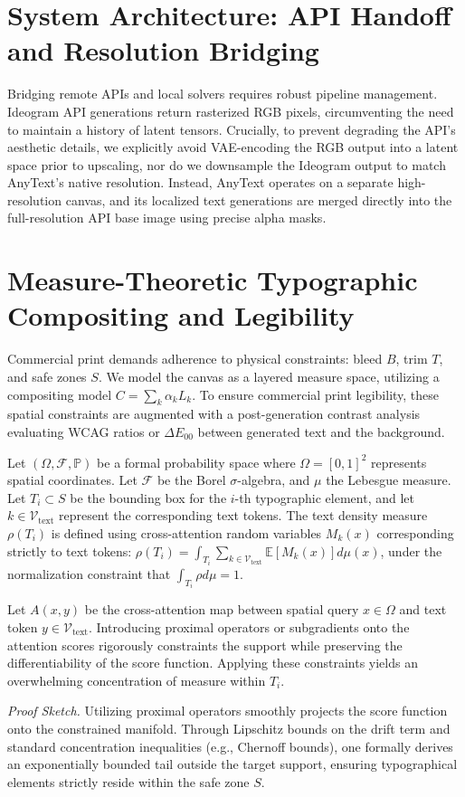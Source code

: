 \documentclass[10pt,journal,compsoc]{IEEEtran}
\begin{document}
\section{System Architecture: API Handoff and Resolution Bridging}
Bridging remote APIs and local solvers requires robust pipeline management. Ideogram API generations return rasterized RGB pixels, circumventing the need to maintain a history of latent tensors. Crucially, to prevent degrading the API's aesthetic details, we explicitly avoid VAE-encoding the RGB output into a latent space prior to upscaling, nor do we downsample the Ideogram output to match AnyText's native resolution. Instead, AnyText operates on a separate high-resolution canvas, and its localized text generations are merged directly into the full-resolution API base image using precise alpha masks.

\section{Measure-Theoretic Typographic Compositing and Legibility}
Commercial print demands adherence to physical constraints: bleed $B$, trim $T$, and safe zones $S$. We model the canvas as a layered measure space, utilizing a compositing model $C = \sum_{k} \alpha_k L_k$. To ensure commercial print legibility, these spatial constraints are augmented with a post-generation contrast analysis evaluating WCAG ratios or $\Delta E_{00}$ between generated text and the background.

\begin{definition}
Let $(\Omega, \mathcal{F}, \mathbb{P})$ be a formal probability space where $\Omega = [0,1]^2$ represents spatial coordinates. Let $\mathcal{F}$ be the Borel $\sigma$-algebra, and $\mu$ the Lebesgue measure. Let $T_i \subset S$ be the bounding box for the $i$-th typographic element, and let $k \in \mathcal{V}_{\text{text}}$ represent the corresponding text tokens. The text density measure $\rho(T_i)$ is defined using cross-attention random variables $M_k(x)$ corresponding strictly to text tokens: $\rho(T_i) = \int_{T_i} \sum_{k \in \mathcal{V}_{\text{text}}} \mathbb{E}[M_k(x)] d\mu(x)$, under the normalization constraint that $\int_{T_i} \rho d\mu = 1$.
\end{definition}

\begin{theorem}
Let $A(x, y)$ be the cross-attention map between spatial query $x \in \Omega$ and text token $y \in \mathcal{V}_{\text{text}}$. Introducing proximal operators or subgradients onto the attention scores rigorously constraints the support while preserving the differentiability of the score function. Applying these constraints yields an overwhelming concentration of measure within $T_i$.
\end{theorem}
\textit{Proof Sketch.} Utilizing proximal operators smoothly projects the score function onto the constrained manifold. Through Lipschitz bounds on the drift term and standard concentration inequalities (e.g., Chernoff bounds), one formally derives an exponentially bounded tail outside the target support, ensuring typographical elements strictly reside within the safe zone $S$.
\end{document}
